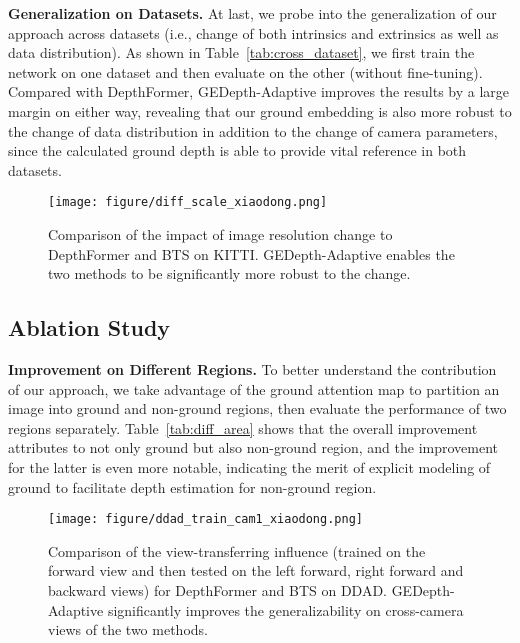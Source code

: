\documentclass[10pt,twocolumn,letterpaper]{article}
\begin{document}
\noindent\textbf{Generalization on Datasets.} 
At last, we probe into the generalization of our approach across datasets (i.e., change of both intrinsics and extrinsics as well as data distribution). As shown in Table~\ref{tab:cross_dataset}, we first train the network on one dataset and then evaluate on the other (without fine-tuning). Compared with DepthFormer, GEDepth-Adaptive improves the results by a large margin on either way, revealing that our ground embedding is also more robust to the change of data distribution in addition to the change of camera parameters, since the calculated ground depth is able to provide vital reference in both datasets.  

\begin{figure}[t]
\centering
\texttt{[image: figure/diff\_scale\_xiaodong.png]}
\caption{
Comparison of the impact of image resolution change to DepthFormer and BTS on KITTI. GEDepth-Adaptive enables the two methods to be significantly more robust to the change.  
}
\label{fig:kitti_resize}
\end{figure}

\subsection{Ablation Study}
\label{section:ablation_study}

\noindent\textbf{Improvement on Different Regions.}  
To better understand the contribution of our approach, we take advantage of the ground attention map to partition an image into ground and non-ground regions, then evaluate the performance of two regions separately. Table~\ref{tab:diff_area} shows that the overall improvement attributes to not only ground but also non-ground region, and the improvement for the latter is even more notable, indicating the merit of explicit modeling of ground to facilitate depth estimation for non-ground region.

\begin{figure}[t]
\centering
\texttt{[image: figure/ddad\_train\_cam1\_xiaodong.png]}
\caption{
Comparison of the view-transferring influence (trained on the forward view and then tested on the left forward, right forward and backward views) for DepthFormer and BTS on DDAD. GEDepth-Adaptive significantly improves the generalizability on cross-camera views of the two methods.
}
\label{fig:ddad_train_cam1}
\end{figure}
\end{document}
